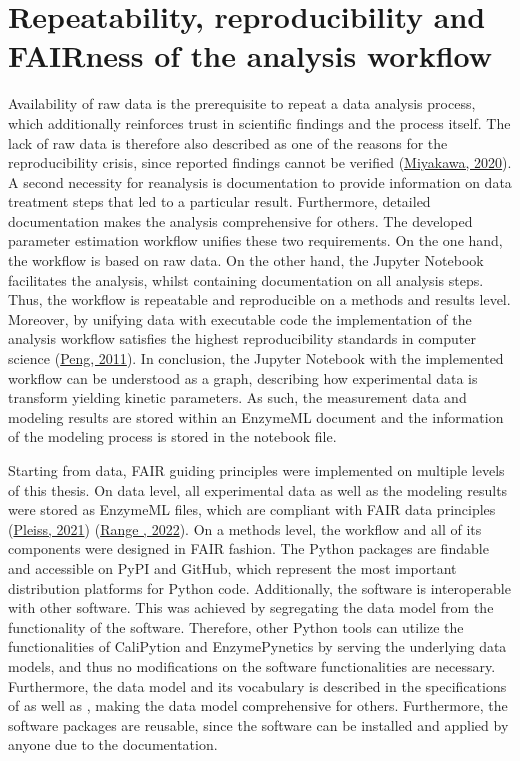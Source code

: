 \documentclass[letterpaper,12pt,english]{jupyterBook}
\begin{document}
\section{Repeatability, reproducibility and FAIRness of the analysis workflow}
\label{\detokenize{discussion:repeatability-reproducibility-and-fairness-of-the-analysis-workflow}}
\sphinxAtStartPar
Availability of raw data is the prerequisite to repeat a data analysis process, which additionally reinforces trust in scientific findings and the process itself. The lack of raw data is therefore also described as one of the reasons for the reproducibility crisis, since reported findings cannot be verified (\hyperlink{cite.references:id21}{Miyakawa, 2020}).
A second necessity for reanalysis is documentation to provide information on data treatment steps that led to a particular result. Furthermore, detailed documentation makes the analysis comprehensive for others. The developed parameter estimation workflow unifies these two requirements. On the one hand, the workflow is based on raw data. On the other hand, the Jupyter Notebook facilitates the analysis, whilst containing documentation on all analysis steps. Thus, the workflow is repeatable and reproducible on a methods and results level. Moreover, by unifying data with executable code the implementation of the analysis workflow satisfies the highest reproducibility standards in computer science (\hyperlink{cite.references:id22}{Peng, 2011}).
In conclusion, the Jupyter Notebook with the implemented workflow can be understood as a graph, describing how experimental data is transform yielding kinetic parameters. As such, the measurement data and modeling results are stored within an EnzymeML document and the information of the modeling process is stored in the notebook file.

\sphinxAtStartPar
Starting from data, FAIR guiding principles were implemented on multiple levels of this thesis. On data level, all experimental data as well as the modeling results were stored as EnzymeML files, which are compliant with FAIR data principles (\hyperlink{cite.references:id4}{Pleiss, 2021}) (\hyperlink{cite.references:id18}{Range , 2022}). On a methods level, the workflow and all of its components were designed in FAIR fashion. The Python packages are findable and accessible on PyPI and GitHub, which represent the most important distribution platforms for Python code. Additionally, the software is interoperable with other software. This was achieved by segregating the data model from the functionality of the software. Therefore, other Python tools can utilize the functionalities of CaliPytion and EnzymePynetics by serving the underlying data models, and thus no modifications on the software functionalities are necessary. Furthermore, the data model and its vocabulary is described in the specifications of  as well as , making the data model comprehensive for others. Furthermore, the software packages are reusable, since the software can be installed and applied by anyone due to the documentation.
\end{document}
